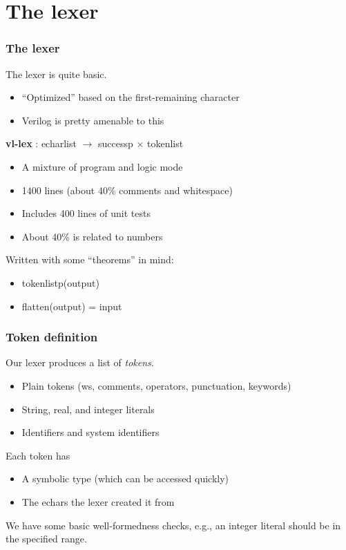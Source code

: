 \documentclass{beamer}
\newcommand{\SmallSkip}{\vspace{0.5cm}\noindent}
\begin{document}
\section[The lexer]{The lexer}
\begin{frame}
\frametitle{The lexer}

The lexer is quite basic.
\begin{itemize}
\item ``Optimized'' based on the first-remaining character
\item Verilog is pretty amenable to this
\end{itemize}

\SmallSkip

{\bf vl-lex} : echarlist $\rightarrow$ successp $\times$ tokenlist

\begin{itemize}
\item A mixture of program and logic mode
\item 1400 lines (about 40\% comments and whitespace)
\item Includes 400 lines of unit tests
\item About 40\% is related to numbers
\end{itemize}

\SmallSkip
Written with some ``theorems'' in mind:
\begin{itemize}
\item tokenlistp(output)
\item flatten(output) = input
\end{itemize}

\end{frame}



\begin{frame}
\frametitle{Token definition}

Our lexer produces a list of {\em tokens}.
\begin{itemize}
\item Plain tokens (ws, comments, operators, punctuation, keywords)
\item String, real, and integer literals
\item Identifiers and system identifiers
\end{itemize}

\SmallSkip
Each token has
\begin{itemize}
\item A symbolic type (which can be accessed quickly)
\item The echars the lexer created it from
\end{itemize}

\SmallSkip 

We have some basic well-formedness checks, e.g., an integer literal
should be in the specified range.

\end{frame}
\end{document}
